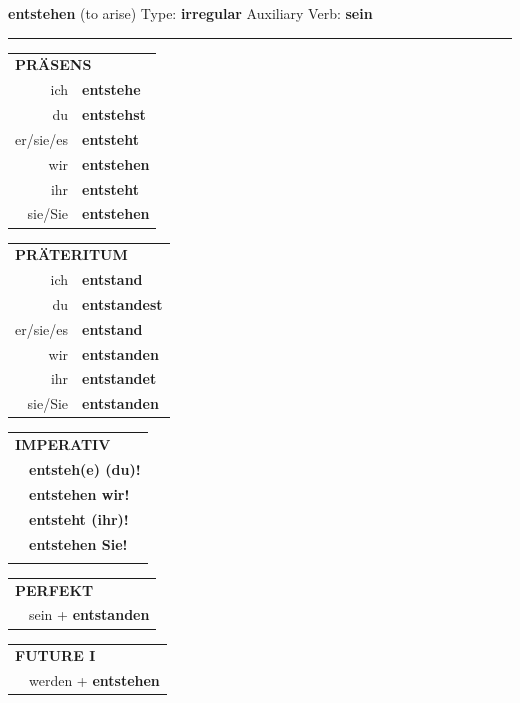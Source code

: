 \documentclass[10pt,a4paper]{revtex4-2}
\begin{document}
\begin{verbbox}
    {\Large \bf entstehen} (to arise) \hfill Type: \textbf{irregular} \hfill Auxiliary Verb: \textbf{sein} 
    
     \vspace{5pt}

    \hrule
    
    \vspace{5pt}

  \begin{tabular}{rl}
     \multicolumn{2}{l}{\textbf{PRÄSENS} }\\
    ich & \textbf{entstehe}\\
    du & \textbf{entstehst}\\
    er/sie/es & \textbf{entsteht}\\
    wir & \textbf{entstehen}\\
    ihr & \textbf{entsteht}\\
    sie/Sie & \textbf{entstehen}\\
  \end{tabular}
  \hfill
     \begin{tabular}{rl}
    \multicolumn{2}{l}{\textbf{PRÄTERITUM} }\\
    ich & \textbf{entstand}\\
    du & \textbf{entstandest}\\
    er/sie/es & \textbf{entstand}\\
    wir & \textbf{entstanden}\\
    ihr & \textbf{entstandet}\\
    sie/Sie & \textbf{entstanden}\\
  \end{tabular}
  \hfill
  \begin{tabular}{rl}
     \multicolumn{2}{l}{\textbf{IMPERATIV} }\\
   & \textbf{entsteh(e) (du)!}\\
   & \textbf{entstehen wir!}\\
   & \textbf{entsteht (ihr)!}\\
   & \textbf{entstehen Sie!}\\
   & \vspace{10pt}
  \end{tabular}

    \vspace{10pt}

 \begin{tabular}{ll}
     \multicolumn{2}{l}{\textbf{PERFEKT}}\\
   & sein + \textbf{entstanden}\\
  \end{tabular}
\hfill
   \begin{tabular}{rl}
    \multicolumn{2}{l}{\textbf{FUTURE I} }\\
   & werden + \textbf{entstehen}\\
 

\end{tabular}
\end{verbbox}
\end{document}
